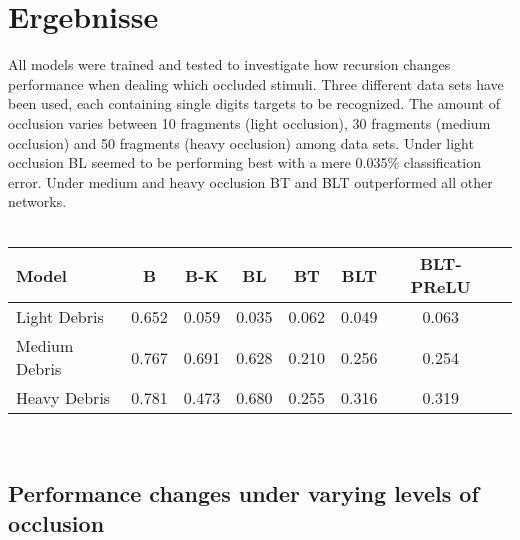 \section{Ergebnisse}\label{Ergebnisse}
All models were trained and tested to investigate how recursion changes performance when dealing which occluded stimuli. Three different data sets have been used, each containing single digits targets to be recognized. The amount of occlusion varies between 10 fragments (light occlusion), 30 fragments (medium occlusion) and 50 fragments (heavy occlusion) among data sets. Under light occlusion BL seemed to be performing best with a mere 0.035\% classification error. Under medium and heavy occlusion BT and BLT outperformed all other networks.\\
\\
\begin{tabular}{l*{6}{c}r}
	Model              & B & B-K & BL & BT & BLT  & BLT-PReLU \\
	\hline
	Light Debris 		& 0.652 & 0.059 & 0.035 & 0.062 & 0.049 & 0.063\\
	Medium Debris            & 0.767 & 0.691 & 0.628 & 0.210 &  0.256 & 0.254\\
	Heavy Debris           & 0.781 & 0.473 & 0.680 & 0.255 &  0.316 & 0.319\\
\end{tabular}
\\
\subsection{Performance changes under varying levels of occlusion}

\dataset
{}